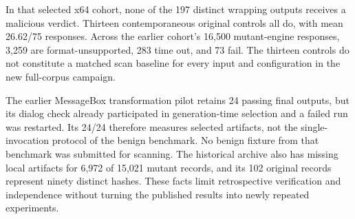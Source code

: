 In that selected x64 cohort, none of the 197 distinct wrapping outputs
receives a malicious verdict. Thirteen contemporaneous original controls
all do, with mean 26.62/75 responses. Across the earlier cohort's 16,500
mutant-engine responses, 3,259 are format-unsupported, 283 time out, and
73 fail. The thirteen controls do not constitute a matched scan baseline
for every input and configuration in the new full-corpus campaign.

The earlier MessageBox transformation pilot retains 24 passing final
outputs, but its dialog check already participated in generation-time
selection and a failed run was restarted. Its 24/24 therefore measures
selected artifacts, not the single-invocation protocol of the benign
benchmark. No benign fixture from that benchmark was submitted for scanning.
The historical archive also has missing local artifacts for 6,972 of
15,021 mutant records, and its 102 original records represent ninety
distinct hashes. These facts limit retrospective verification and
independence without turning the published results into newly repeated
experiments.
